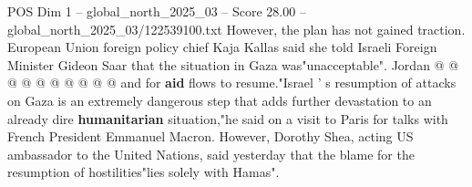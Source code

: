 \begin{textsample}{POS Dim 1 – global\_north\_2025\_03 – Score 28.00 – global\_north\_2025\_03/122539100.txt}
However, the plan has not gained traction.
European Union foreign policy chief Kaja Kallas said she told Israeli Foreign Minister Gideon Saar that the situation in Gaza was"unacceptable".
Jordan @ @ @ @ @ @ @ @ @ @ and for \textbf{aid} flows to resume."Israel ' s resumption of attacks on Gaza is an extremely dangerous step that adds further devastation to an already dire \textbf{humanitarian} situation,"he said on a visit to Paris for talks with French President Emmanuel Macron.
However, Dorothy Shea, acting US ambassador to the United Nations, said yesterday that the blame for the resumption of hostilities"lies solely with Hamas".

\end{textsample}
